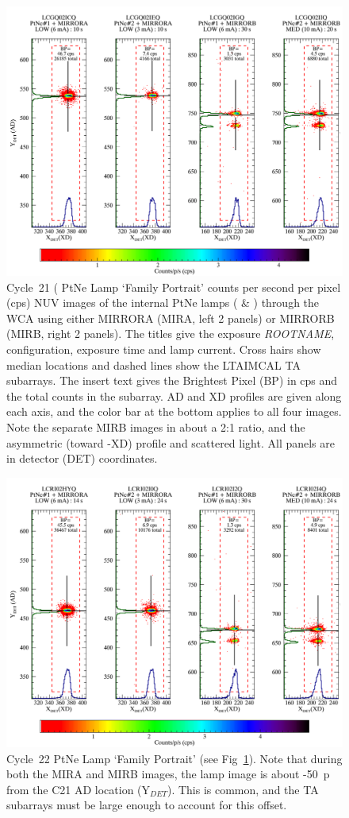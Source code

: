 \begin{figure}[htb]
\noindent\includegraphics[width=0.7\linewidth]{png/C21_13526_FP.png}
\caption[C21 WCA Lamp `Family Portrait']{Cycle~21 ( PtNe Lamp `Family Portrait'
counts per second per pixel (cps) NUV images of the internal PtNe lamps (\plampone{} \& \plamptwo{}) through the
WCA using either MIRRORA (MIRA, left 2 panels) or MIRRORB (MIRB, right 2 panels). The titles
give the exposure \textit{ROOTNAME}, configuration, exposure time and lamp current. Cross hairs show median locations and dashed
lines show the \textsc{LTAIMCAL} TA subarrays.
The insert text gives the Brightest Pixel (BP) in cps and the total counts in the subarray.
AD and XD profiles are given along each axis, and the color bar at the
bottom applies to all four images. Note the separate MIRB images in about a 2:1 ratio, and the asymmetric
(toward -XD) profile and scattered light. All panels are in detector (DET) coordinates.\label{fig:FG21}}
\end{figure}
\begin{center}
	\begin{figure}[htb]
	\noindent\includegraphics*[width=0.7\linewidth]{png/C22_13972_FP.png}
	\caption[C22 WCA Lamp `Family Portrait']{\footnotesize Cycle~22 PtNe Lamp `Family Portrait' (see Fig~\ref{fig:FG21}).
	Note that during both the MIRA and MIRB images, the lamp image is about -50~p from the C21 AD location (Y$_{DET}$).
	This is common, and the TA subarrays must be large enough to account for this offset.\label{fig:FG22}}
	\end{figure}
\end{center}
